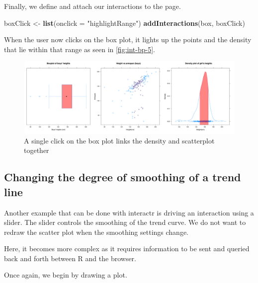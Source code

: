 \documentclass[11pt,]{report}
\newenvironment{Shaded}{\begin{snugshade}}{\end{snugshade}}
\newcommand{\KeywordTok}[1]{\textcolor[rgb]{0.13,0.29,0.53}{\textbf{#1}}}
\newcommand{\DataTypeTok}[1]{\textcolor[rgb]{0.13,0.29,0.53}{#1}}
\newcommand{\StringTok}[1]{\textcolor[rgb]{0.31,0.60,0.02}{#1}}
\newcommand{\NormalTok}[1]{#1}
\begin{document}
Finally, we define and attach our interactions to the page.

\begin{Shaded}
\begin{Highlighting}[]
\NormalTok{boxClick <-}\StringTok{ }\KeywordTok{list}\NormalTok{(}\DataTypeTok{onclick =} \StringTok{"highlightRange"}\NormalTok{)}
\KeywordTok{addInteractions}\NormalTok{(box, boxClick)}
\end{Highlighting}
\end{Shaded}

When the user now clicks on the box plot, it lights up the points and
the density that lie within that range as seen in
\autoref{fig:int-bp-5}.

\begin{figure}[H]

{\centering \includegraphics[width=0.7\linewidth,]{./fig/int-bp-5} 

}

\caption{\label{fig:int-bp-5} A single click on the box plot links the density and scatterplot together}\label{fig:unnamed-chunk-66}
\end{figure}

\subsection{Changing the degree of smoothing of a trend
line}\label{changing-the-degree-of-smoothing-of-a-trend-line}

Another example that can be done with \textsf{interactr} is driving an
interaction using a slider. The slider controls the smoothing of the
trend curve. We do not want to redraw the scatter plot when the
smoothing settings change.

Here, it becomes more complex as it requires information to be sent and
queried back and forth between R and the browser.

Once again, we begin by drawing a plot.
\end{document}

